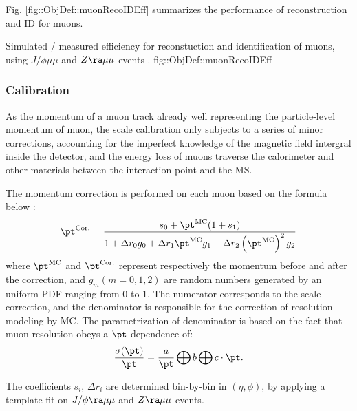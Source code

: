 Fig. \ref{fig::ObjDef::muonRecoIDEff} summarizes the performance of reconstruction and ID for muons.

{ Simulated / measured efficiency for reconstuction and identification of muons, using $J/\phi\mu\mu$ and $Z\ra\mu\mu$ events \cite{166_muonPerformance2015data}.}
{fig::ObjDef::muonRecoIDEff}





\subsubsection{Calibration} \label{sec::objDef::muons::calib}
As the momentum of a muon track already well representing the particle-level momentum of muon, 
the scale calibration only subjects to a series of minor corrections, accounting for the imperfect knowledge of the magnetic field intergral inside the detector, and the energy loss of muons traverse the calorimeter and other materials between the interaction point and the MS.

The momentum correction is performed on each muon based on the formula below \cite{165_muonPerf2011_2012}:
\begin{align}
\pt^{\mathrm{Cor.}} = \frac{ s_0  + \pt^{\mathrm{MC}}  (1+s_1) } {1+ \Delta r_0  g_0  + \Delta r_1 
 \pt^{\mathrm{MC}} g_1  + \Delta r_2 \left( \pt^{\mathrm{MC}} \right)^2  g_2} 
\end{align}
where $\pt^{\mathrm{MC}}$ and $\pt^{\mathrm{Cor.}}$ represent respectively the momentum before and after the correction, and $g_m (m=0,1,2)$ are random numbers generated by an uniform PDF ranging from 0 to 1.
The numerator corresponds to the scale correction, and the denominator is responsible for the correction of resolution modeling by MC. The parametrization of denominator is based on the fact that muon resolution obeys a $\pt$ dependence of:
\begin{align}
\frac{\sigma(\pt)}{\pt} = \frac{a}{\pt} \bigoplus b \bigoplus c \cdot \pt.
\end{align}

The coefficients $s_i$, $\Delta r_i$ are determined bin-by-bin in $(\eta,\phi)$, 
by applying a template fit on $J/\phi\ra \mu\mu$ and $Z\ra \mu\mu$ events.

